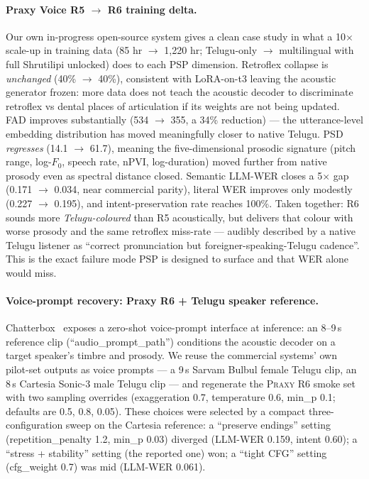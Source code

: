 \documentclass[conference,a4paper]{IEEEtran}
\newcommand{\praxy}{\textsc{Praxy}}
\begin{document}
\paragraph{Praxy Voice R5 $\to$ R6 training delta.} Our own in-progress open-source system gives a clean case study in what a 10$\times$ scale-up in training data (85 hr $\to$ 1{,}220 hr; Telugu-only $\to$ multilingual with full Shrutilipi unlocked) does to each PSP dimension. Retroflex collapse is \emph{unchanged} (40\% $\to$ 40\%), consistent with LoRA-on-t3 leaving the acoustic generator frozen: more data does not teach the acoustic decoder to discriminate retroflex vs dental places of articulation if its weights are not being updated. FAD improves substantially (534 $\to$ 355, a 34\% reduction) --- the utterance-level embedding distribution has moved meaningfully closer to native Telugu. PSD \emph{regresses} (14.1 $\to$ 61.7), meaning the five-dimensional prosodic signature (pitch range, log-$F_0$, speech rate, nPVI, log-duration) moved further from native prosody even as spectral distance closed. Semantic LLM-WER closes a 5$\times$ gap (0.171 $\to$ 0.034, near commercial parity), literal WER improves only modestly (0.227 $\to$ 0.195), and intent-preservation rate reaches 100\%. Taken together: R6 sounds more \emph{Telugu-coloured} than R5 acoustically, but delivers that colour with worse prosody and the same retroflex miss-rate --- audibly described by a native Telugu listener as ``correct pronunciation but foreigner-speaking-Telugu cadence''. This is the exact failure mode PSP is designed to surface and that WER alone would miss.

\paragraph{Voice-prompt recovery: Praxy R6 + Telugu speaker reference.} Chatterbox~\cite{chatterbox2025} exposes a zero-shot voice-prompt interface at inference: an 8--9\,s reference clip (``audio\_prompt\_path'') conditions the acoustic decoder on a target speaker's timbre and prosody. We reuse the commercial systems' own pilot-set outputs as voice prompts --- a 9\,s Sarvam Bulbul female Telugu clip, an 8\,s Cartesia Sonic-3 male Telugu clip --- and regenerate the \praxy{} R6 smoke set with two sampling overrides (exaggeration 0.7, temperature 0.6, min\_p 0.1; defaults are 0.5, 0.8, 0.05). These choices were selected by a compact three-configuration sweep on the Cartesia reference: a ``preserve endings'' setting (repetition\_penalty 1.2, min\_p 0.03) diverged (LLM-WER 0.159, intent 0.60); a ``stress + stability'' setting (the reported one) won; a ``tight CFG'' setting (cfg\_weight 0.7) was mid (LLM-WER 0.061).
\end{document}
